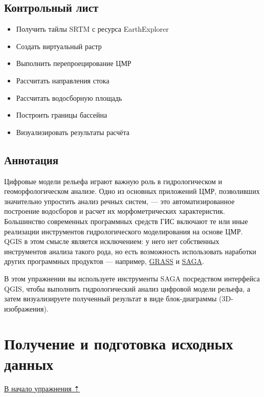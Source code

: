 \documentclass[
  12pt,
]{book}
\begin{document}
\hypertarget{hydrodem-control}{%
\subsection{Контрольный лист}\label{hydrodem-control}}

\begin{itemize}
\item
  Получить тайлы SRTM с ресурса EarthExplorer
\item
  Создать виртуальный растр
\item
  Выполнить перепроецирование ЦМР
\item
  Рассчитать направления стока
\item
  Рассчитать водосборную площадь
\item
  Построить границы бассейна
\item
  Визуализировать результаты расчёта
\end{itemize}

\hypertarget{hydrodem-annotation}{%
\subsection{Аннотация}\label{hydrodem-annotation}}

Цифровые модели рельефа играют важную роль в гидрологическом и геоморфологическом анализе. Одно из основных приложений ЦМР, позволивших значительно упростить анализ речных систем, --- это автоматизированное построение водосборов и расчет их морфометрических характеристик. Большинство современных программных средств ГИС включают те или иные реализации инструментов гидрологического моделирования на основе ЦМР. QGIS в этом смысле является исключением: у него нет собственных инструментов анализа такого рода, но есть возможность использовать наработки других программных продуктов --- например, \href{https://grass.osgeo.org/}{GRASS} и \href{https://saga-gis.sourceforge.io/en/index.html}{SAGA}.

В этом упражнении вы используете инструменты SAGA посредством интерфейса QGIS, чтобы выполнить гидрологический анализ цифровой модели рельефа, а затем визуализируете полученный результат в виде блок-диаграммы (3D-изображения).

\hypertarget{hydrodem-init}{%
\section{Получение и подготовка исходных данных}\label{hydrodem-init}}

\protect\hyperlink{hydrodem}{В начало упражнения ⇡}
\end{document}
